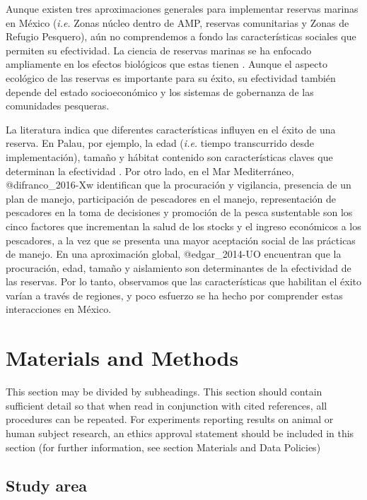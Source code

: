 \documentclass{frontiersSCNS}
\begin{document}
Aunque existen tres aproximaciones generales para implementar reservas
marinas en México (\emph{i.e.} Zonas núcleo dentro de AMP, reservas
comunitarias y Zonas de Refugio Pesquero), aún no comprendemos a fondo
las características sociales que permiten su efectividad. La ciencia de
reservas marinas se ha enfocado ampliamente en los efectos biológicos
que estas tienen
\citep{lester_2009-Ks,giakoumi_2017-V2,sala_2017-69,afflerbach_2014-HP,krueck_2017-J1}.
Aunque el aspecto ecológico de las reservas es importante para su éxito,
su efectividad también depende del estado socioeconómico y los sistemas
de gobernanza de las comunidades pesqueras.

La literatura indica que diferentes características influyen en el éxito
de una reserva. En Palau, por ejemplo, la edad (\emph{i.e.} tiempo
transcurrido desde implementación), tamaño y hábitat contenido son
características claves que determinan la efectividad
\citep{friedlander_2017-oI}. Por otro lado, en el Mar Mediterráneo,
@difranco\_2016-Xw identifican que la procuración y vigilancia,
presencia de un plan de manejo, participación de pescadores en el
manejo, representación de pescadores en la toma de decisiones y
promoción de la pesca sustentable son los cinco factores que incrementan
la salud de los stocks y el ingreso económicos a los pescadores, a la
vez que se presenta una mayor aceptación social de las prácticas de
manejo. En una aproximación global, @edgar\_2014-UO encuentran que la
procuración, edad, tamaño y aislamiento son determinantes de la
efectividad de las reservas. Por lo tanto, observamos que las
características que habilitan el éxito varían a través de regiones, y
poco esfuerzo se ha hecho por comprender estas interacciones en México.

\section{Materials and Methods}\label{materials-and-methods}

This section may be divided by subheadings. This section should contain
sufficient detail so that when read in conjunction with cited
references, all procedures can be repeated. For experiments reporting
results on animal or human subject research, an ethics approval
statement should be included in this section (for further information,
see section Materials and Data Policies)

\subsection{Study area}\label{study-area}
\end{document}
